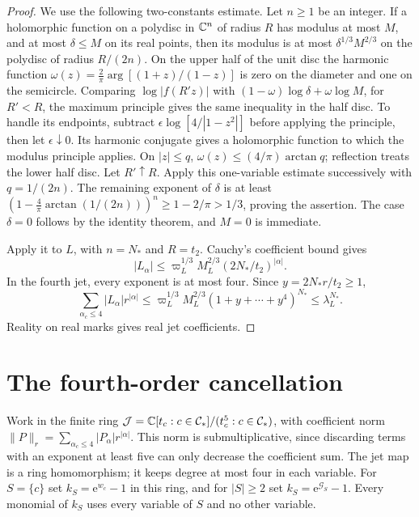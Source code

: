 \begin{proof}
We use the following two-constants estimate.
Let $n\ge1$ be an integer. If a holomorphic function
on a polydisc in $\mathbb C^n$ of radius $R$ has modulus at most $M$, and
at most $\delta\le M$ on its real points,
then its modulus is at most $\delta^{1/3}M^{2/3}$
on the polydisc of radius $R/(2n)$.
On the upper
half of the unit disc the harmonic function
$\omega(z)=\frac2\pi\arg[(1+z)/(1-z)]$
is zero on the diameter and one on the
semicircle. Comparing $\log|f(R'z)|$
with $(1-\omega)\log\delta+\omega\log M$,
for $R'<R$, the maximum principle gives
the same inequality in the half disc.
To handle its endpoints, subtract
$\epsilon\log[4/|1-z^2|]$ before applying
the principle, then let $\epsilon\downarrow0$.
Its harmonic conjugate gives a holomorphic
function to which the modulus principle
applies. On $|z|\le q$, $\omega(z)\le
(4/\pi)\arctan q$; reflection treats the
lower half disc. Let $R'\uparrow R$.
Apply this one-variable estimate successively
with $q=1/(2n)$. The remaining exponent of
$\delta$ is at least
$(1-\frac4\pi\arctan(1/(2n)))^n
\ge1-2/\pi>1/3$, proving the assertion.
The case $\delta=0$ follows by the identity
theorem, and $M=0$ is immediate.

Apply it to $L$, with $n=N_*$ and $R=t_2$.
Cauchy's coefficient bound gives
\[
 |L_\alpha|\le\varpi_L^{1/3}M_L^{2/3}(2N_*/t_2)^{|\alpha|}.
\]
In the fourth jet, every exponent is at most
four. Since $y=2N_*r/t_2\ge1$,
\[
 \sum_{\alpha_c\le4}|L_\alpha|r^{|\alpha|}
   \le\varpi_L^{1/3}M_L^{2/3}
                 (1+y+\cdots+y^4)^{N_*}
   \le\lambda_L^{N_*}.
\]
Reality on real marks gives real jet coefficients.
\end{proof}

\section{The fourth-order cancellation}
\label{subsec:interacting-fourth-jet}

Work in the finite ring
$\mathcal J=\mathbb C[t_c:c\in\mathcal C_*]/(t_c^5:c\in\mathcal C_*)$,
with coefficient norm
$\|P\|_r=\sum_{\alpha_c\le4}|P_\alpha|r^{|\alpha|}$.
This norm is submultiplicative, since discarding
terms with an exponent at least five can only
decrease the coefficient sum.
The jet map is a ring homomorphism; it
keeps degree at most four in each variable.
For $S=\{c\}$ set $k_S=\mathrm e^{w_c}-1$ in this
ring, and for $|S|\ge2$ set
$k_S=\mathrm e^{\mathcal G_S}-1$.
Every monomial of $k_S$ uses every variable
of $S$ and no other variable.


